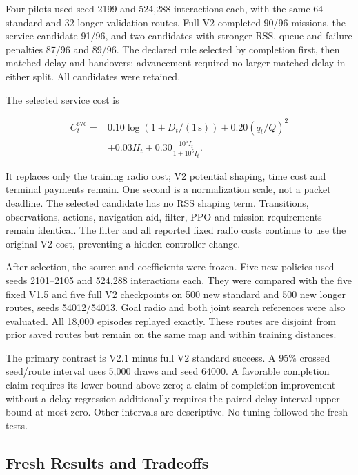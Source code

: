 Four pilots used seed 2199 and 524,288 interactions each, with the same 64 standard and 32 longer validation routes. Full V2 completed 90/96 missions, the service candidate 91/96, and two candidates with stronger RSS, queue and failure penalties 87/96 and 89/96. The declared rule selected by completion first, then matched delay and handovers; advancement required no larger matched delay in either split. All candidates were retained.

The selected service cost is

\begin{align}
C^{\mathrm{svc}}_t={}&0.10\log(1+D_t/(1\,\mathrm{s}))+0.20(q_t/Q)^2\nonumber\\
&+0.03H_t+0.30\frac{10^5I_t}{1+10^5I_t}.
\end{align}

It replaces only the training radio cost; V2 potential shaping, time cost and terminal payments remain. One second is a normalization scale, not a packet deadline. The selected candidate has no RSS shaping term. Transitions, observations, actions, navigation aid, filter, PPO and mission requirements remain identical. The filter and all reported fixed radio costs continue to use the original V2 cost, preventing a hidden controller change.

After selection, the source and coefficients were frozen. Five new policies used seeds 2101--2105 and 524,288 interactions each. They were compared with the five fixed V1.5 and five full V2 checkpoints on 500 new standard and 500 new longer routes, seeds 54012/54013. Goal radio and both joint search references were also evaluated. All 18,000 episodes replayed exactly. These routes are disjoint from prior saved routes but remain on the same map and within training distances.

The primary contrast is V2.1 minus full V2 standard success. A 95\% crossed seed/route interval uses 5,000 draws and seed 64000. A favorable completion claim requires its lower bound above zero; a claim of completion improvement without a delay regression additionally requires the paired delay interval upper bound at most zero. Other intervals are descriptive. No tuning followed the fresh tests.

\subsection{Fresh Results and Tradeoffs}

